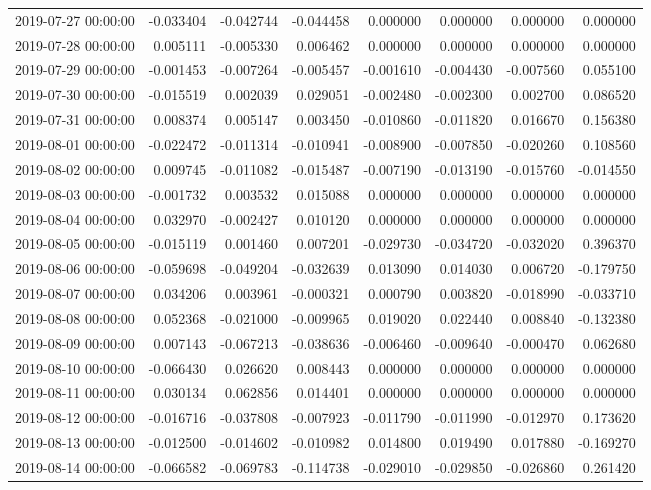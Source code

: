 \begin{tabular}{lrrrrrrr}
2019-07-27 00:00:00 & -0.033404 & -0.042744 & -0.044458 & 0.000000 & 0.000000 & 0.000000 & 0.000000 \\
2019-07-28 00:00:00 & 0.005111 & -0.005330 & 0.006462 & 0.000000 & 0.000000 & 0.000000 & 0.000000 \\
2019-07-29 00:00:00 & -0.001453 & -0.007264 & -0.005457 & -0.001610 & -0.004430 & -0.007560 & 0.055100 \\
2019-07-30 00:00:00 & -0.015519 & 0.002039 & 0.029051 & -0.002480 & -0.002300 & 0.002700 & 0.086520 \\
2019-07-31 00:00:00 & 0.008374 & 0.005147 & 0.003450 & -0.010860 & -0.011820 & 0.016670 & 0.156380 \\
2019-08-01 00:00:00 & -0.022472 & -0.011314 & -0.010941 & -0.008900 & -0.007850 & -0.020260 & 0.108560 \\
2019-08-02 00:00:00 & 0.009745 & -0.011082 & -0.015487 & -0.007190 & -0.013190 & -0.015760 & -0.014550 \\
2019-08-03 00:00:00 & -0.001732 & 0.003532 & 0.015088 & 0.000000 & 0.000000 & 0.000000 & 0.000000 \\
2019-08-04 00:00:00 & 0.032970 & -0.002427 & 0.010120 & 0.000000 & 0.000000 & 0.000000 & 0.000000 \\
2019-08-05 00:00:00 & -0.015119 & 0.001460 & 0.007201 & -0.029730 & -0.034720 & -0.032020 & 0.396370 \\
2019-08-06 00:00:00 & -0.059698 & -0.049204 & -0.032639 & 0.013090 & 0.014030 & 0.006720 & -0.179750 \\
2019-08-07 00:00:00 & 0.034206 & 0.003961 & -0.000321 & 0.000790 & 0.003820 & -0.018990 & -0.033710 \\
2019-08-08 00:00:00 & 0.052368 & -0.021000 & -0.009965 & 0.019020 & 0.022440 & 0.008840 & -0.132380 \\
2019-08-09 00:00:00 & 0.007143 & -0.067213 & -0.038636 & -0.006460 & -0.009640 & -0.000470 & 0.062680 \\
2019-08-10 00:00:00 & -0.066430 & 0.026620 & 0.008443 & 0.000000 & 0.000000 & 0.000000 & 0.000000 \\
2019-08-11 00:00:00 & 0.030134 & 0.062856 & 0.014401 & 0.000000 & 0.000000 & 0.000000 & 0.000000 \\
2019-08-12 00:00:00 & -0.016716 & -0.037808 & -0.007923 & -0.011790 & -0.011990 & -0.012970 & 0.173620 \\
2019-08-13 00:00:00 & -0.012500 & -0.014602 & -0.010982 & 0.014800 & 0.019490 & 0.017880 & -0.169270 \\
2019-08-14 00:00:00 & -0.066582 & -0.069783 & -0.114738 & -0.029010 & -0.029850 & -0.026860 & 0.261420 \\

\end{tabular}
